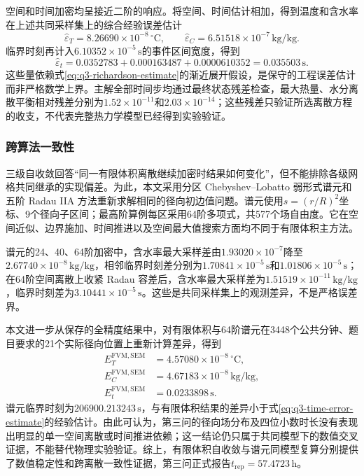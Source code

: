 \documentclass[withoutpreface,bwprint]{cumcmthesis}
\begin{document}
空间和时间加密均呈接近二阶的响应。将空间、时间估计相加，得到温度和含水率在上述共同采样集上的综合经验误差估计
\begin{equation}
\widehat\varepsilon_T=8.26690\times10^{-8}\,{}^\circ\mathrm C,
\qquad
\widehat\varepsilon_C=6.51518\times10^{-7}\,\mathrm{kg/kg}.
\label{eq:q3-field-error-estimates}
\end{equation}
临界时刻再计入$6.10352\times10^{-5}\,\mathrm s$的事件区间宽度，得到
\begin{equation}
\widehat\varepsilon_t
=0.0352783+0.000163487+0.0000610352
=0.035503\,\mathrm s.
\label{eq:q3-time-error-estimate}
\end{equation}
这些量依赖式\eqref{eq:q3-richardson-estimate}的渐近展开假设，是保守的工程误差估计而非严格数学上界。主解全部时间步均通过最终状态残差检查，最大热量、水分离散平衡相对残差分别为$1.52\times10^{-11}$和$2.03\times10^{-14}$；这些残差只验证所选离散方程的收支，不代表完整热力学模型已经得到实验验证。

\subsubsection{跨算法一致性}

三级自收敛回答“同一有限体积离散继续加密时结果如何变化”，但不能排除各级网格共同继承的实现偏差。为此，本文采用分区 Chebyshev--Lobatto 弱形式谱元\cite{trefethen2000}和五阶 Radau IIA 方法\cite{hairer1996}重新求解相同的径向初边值问题。谱元使用$s=(r/R)^2$坐标、9个径向子区间；最高阶算例每区采用64阶多项式，共577个场自由度。它在空间近似、边界施加、时间推进以及空间最大值搜索方面均不同于有限体积主方法。

谱元的24、40、64阶加密中，含水率最大采样差由$1.93020\times10^{-7}$降至$2.67740\times10^{-8}\,\mathrm{kg/kg}$，相邻临界时刻差分别为$1.70841\times10^{-5}\,\mathrm s$和$1.01806\times10^{-5}\,\mathrm s$；在64阶空间离散上收紧 Radau 容差后，含水率最大采样差为$1.51519\times10^{-11}\,\mathrm{kg/kg}$，临界时刻差为$3.10441\times10^{-5}\,\mathrm s$。这些是共同采样集上的观测差异，不是严格误差界。

本文进一步从保存的全精度结果中，对有限体积与64阶谱元在3448个公共分钟、题目要求的21个实际径向位置上重新计算差异，得到
\begin{equation}
\begin{aligned}
E_T^{\mathrm{FVM,SEM}}&=4.57080\times10^{-8}\,{}^\circ\mathrm C,\\
E_C^{\mathrm{FVM,SEM}}&=4.67183\times10^{-8}\,\mathrm{kg/kg},\\
E_t^{\mathrm{FVM,SEM}}&=0.0233898\,\mathrm s.
\end{aligned}
\label{eq:q3-cross-algorithm-differences}
\end{equation}
谱元临界时刻为$206900.213243\,\mathrm s$，与有限体积结果的差异小于式\eqref{eq:q3-time-error-estimate}的经验估计。由此可认为，第三问的径向场分布及四位小数时长没有表现出明显的单一空间离散或时间推进依赖；这一结论仍只属于共同模型下的数值交叉证据，不能替代物理实验验证。综上，有限体积自收敛与谱元同模型复算分别提供了数值稳定性和跨离散一致性证据，第三问正式报告$t_{\mathrm{rep}}=57.4723\,\mathrm h$。
\end{document}
